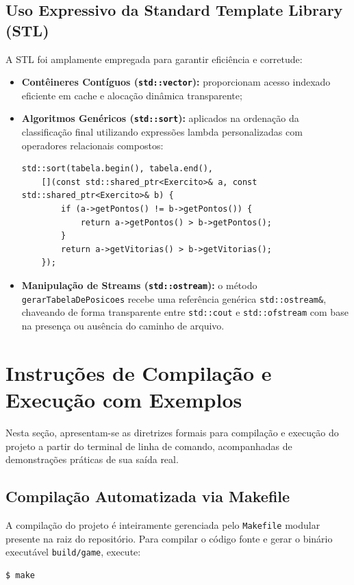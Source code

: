 \documentclass[12pt,a4paper]{article}
\begin{document}
\subsection{Uso Expressivo da Standard Template Library (STL)}
A STL foi amplamente empregada para garantir eficiência e corretude:
\begin{itemize}
    \item \textbf{Contêineres Contíguos (\texttt{std::vector}):} proporcionam acesso indexado eficiente em cache e alocação dinâmica transparente;
    \item \textbf{Algoritmos Genéricos (\texttt{std::sort}):} aplicados na ordenação da classificação final utilizando expressões lambda personalizadas com operadores relacionais compostos:
\begin{lstlisting}[caption={Expressão lambda para ordenação composta da classificação final.}]
std::sort(tabela.begin(), tabela.end(), 
    [](const std::shared_ptr<Exercito>& a, const std::shared_ptr<Exercito>& b) {
        if (a->getPontos() != b->getPontos()) {
            return a->getPontos() > b->getPontos();
        }
        return a->getVitorias() > b->getVitorias();
    });
\end{lstlisting}
    \item \textbf{Manipulação de Streams (\texttt{std::ostream}):} o método \texttt{gerarTabelaDePosicoes} recebe uma referência genérica \texttt{std::ostream\&}, chaveando de forma transparente entre \texttt{std::cout} e \texttt{std::ofstream} com base na presença ou ausência do caminho de arquivo.
\end{itemize}

\section{Instruções de Compilação e Execução com Exemplos}
\label{sec:instrucoes}

Nesta seção, apresentam-se as diretrizes formais para compilação e execução do projeto a partir do terminal de linha de comando, acompanhadas de demonstrações práticas de sua saída real.

\subsection{Compilação Automatizada via Makefile}
A compilação do projeto é inteiramente gerenciada pelo \texttt{Makefile} modular presente na raiz do repositório. Para compilar o código fonte e gerar o binário executável \texttt{build/game}, execute:
\begin{lstlisting}[language=bash, numbers=none, caption={Compilação do projeto via Makefile.}]
$ make
\end{lstlisting}
\end{document}
